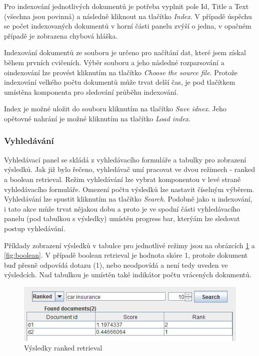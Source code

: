 \documentclass[11pt,a4paper]{scrartcl}
\begin{document}
	Pro indexování jednotlivých dokumentů je potřeba vyplnit pole Id, Title a Text (všechna jsou povinná) a následně kliknout na tlačítko \textit{Index}. V případě úspěchu se počet indexovaných dokumentů v horní části panelu zvýší o jedna, v opačném případě je zobrazena chybová hláška.
	
	Indexování dokumentů ze souboru je určeno pro načítání dat, které jsem získal během prvních cvičeních. Výběr souboru a jeho následné rozparsování a oindexování lze provést kliknutím na tlačítko \textit{Choose the source file}. Protože indexování velkého počtu dokumentů může trvat delší čas, je pod tlačítkem umístěna komponenta pro sledování průběhu indexování. 
	
	Index je možné uložit do souboru kliknutím na tlačítko \textit{Save idnex}. Jeho opětovné nahrání je možné kliknutím na tlačítko \textit{Load index}.

	\subsubsection{Vyhledávání}

	Vyhledávací panel se skládá z vyhledávacího formuláře a tabulky pro zobrazení výsledků. Jak již bylo řečeno, vyhledávač umí pracovat ve dvou režimech - ranked a boolean retrieval. Režim vyhledávání lze vybrat komponentou v levé straně vyhledávacího formuláře. Omezení počtu výsledků lze nastavit číselným výběrem. Vyhledávání lze spustit kliknutím na tlačítko \textit{Search}. Podobně jako u indexování, i tato akce může trvat nějakou dobu a proto je ve spodní části vyhledávacího panelu (pod tabulkou s výsledky) umístěn progress bar, kterýám lze sledovat postup vyhledávání.   
	
	Příklady zobrazení výsledků v tabulce pro jednotlivé režimy jsou na obrázcích \ref{fig:ranked} a \ref{fig:boolean}. V případě boolean retrieval je hodnota skóre 1, protože dokument buď přesně odpovídá dotazu (1), nebo neodpovídá a není tedy uveden ve výsledcích. Nad tabulkou je umístěn také indikátor počtu vrácených dokumentů.

	\begin{figure}[h]
		\centering
		\includegraphics[width=\linewidth]{gui-ranked-res}
		\caption{Výsledky ranked retrieval}
		\label{fig:ranked}
	\end{figure}
\end{document}
